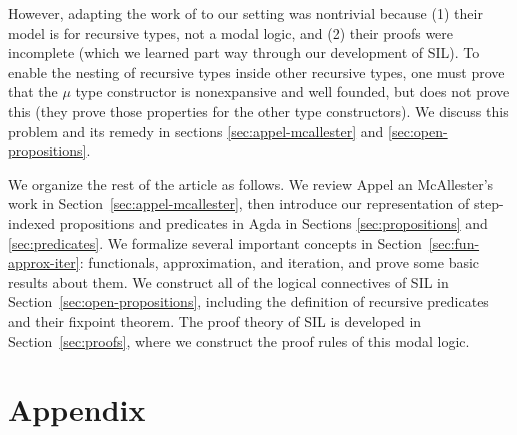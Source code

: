 \documentclass[acmsmall]{acmart}
\begin{document}
However, adapting the work of \citet{Appel:2001aa} to our setting was
nontrivial because (1) their model is for recursive types, not a modal
logic, and (2) their proofs were incomplete (which we learned part way
through our development of SIL). To enable the nesting of recursive
types inside other recursive types, one must prove that the $μ$ type
constructor is nonexpansive and well founded, but \citet{Appel:2001aa}
does not prove this (they prove those properties for the other type
constructors).  We discuss this problem and its remedy in sections
\ref{sec:appel-mcallester} and \ref{sec:open-propositions}.

We organize the rest of the article as follows. We review Appel an
McAllester's work in Section~\ref{sec:appel-mcallester}, then
introduce our representation of step-indexed propositions and
predicates in Agda in Sections \ref{sec:propositions} and
\ref{sec:predicates}.  We formalize several important concepts in
Section~\ref{sec:fun-approx-iter}: functionals, approximation, and
iteration, and prove some basic results about them.  We construct all
of the logical connectives of SIL in
Section~\ref{sec:open-propositions}, including the definition of
recursive predicates and their fixpoint theorem.  The proof theory of
SIL is developed in Section~\ref{sec:proofs}, where we construct the
proof rules of this modal logic.











\appendix
{}
\section*{Appendix}
\end{document}
